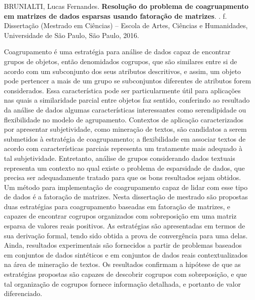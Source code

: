 \documentclass[
    12pt,                %
    oneside,            %
    a4paper,            %
    english,            %
    brazil                %
    ]{abntex2ppgsi}
\begin{document}
\setlength{\absparsep}{18pt} %
\begin{resumo}

%
%
%
%
\begin{flushleft}
BRUNIALTI, Lucas Fernandes. \textbf{Resolução do problema de coagruapmento em matrizes de dados esparsas usando fatoração de matrizes}. \imprimirdata. \pageref{LastPage} f. Dissertação (Mestrado em Ciências) – Escola de Artes, Ciências e Humanidades, Universidade de São Paulo, São Paulo, 2016.
\end{flushleft}

Coagrupamento é uma estratégia para análise de dados capaz de encontrar grupos de objetos, então denomidados cogrupos, que são similares entre si de acordo com um subconjunto dos seus atributos descritivos, e assim, um objeto pode pertencer a mais de um grupo se subconjuntos diferentes de atributos forem considerados. Essa característica pode ser particularmente útil para aplicações nas quais a similaridade parcial entre objetos faz sentido, conferindo ao resultado da análise de dados algumas características interessantes como serendipidade ou flexibilidade no modelo de agrupamento. Contextos de aplicação caracterizados por apresentar subjetividade, como mineração de textos, são candidatos a serem submetidos à estratégia de coagrupamento; a flexibilidade em associar textos de acordo com características parciais representa um tratamente mais adequado à tal subjetividade. Entretanto, análise de grupos considerando dados textuais representa um contexto no qual existe o problema de esparsidade de dados, que precisa ser adequadamente tratado para que os bons resultados sejam obtidos. Um método para implementação de coagrupamento capaz de lidar com esse tipo de dados é a fatoração de matrizes. Nesta dissertação de mestrado são propostas duas estratégias para coagrupamento baseadas em fatoração de matrizes, e capazes de encontrar cogrupos organizados com sobreposição em uma matriz esparsa de valores reais positivos. As estratégias são apresentadas em termos de sua derivação formal, tendo sido obtida a prova de convergência para uma delas. Ainda, resultados experimentais são fornecidos a partir de problemas baseados em conjuntos de dados sintéticos e em conjuntos de dados reais contextualizados na área de mineração de textos. Os resultados confirmam a hipótese de que as estratégias propostas são capazes de descobrir cogrupos com sobreposição, e que tal organização de cogrupos fornece informação detalhada, e portanto de valor diferenciado.


\end{resumo}
\end{document}
